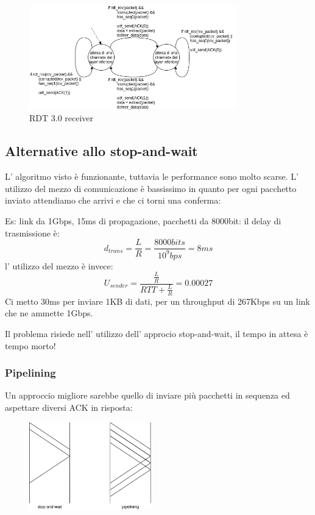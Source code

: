 \begin{figure}[H]
    \centering
    \includegraphics[width=340px]{images/3_Reti_connessione_diretta/rdt_2.2_receiver.png}
    \caption{RDT 3.0 receiver}
\end{figure}

\subsection{Alternative allo stop-and-wait}
L' algoritmo visto è funzionante, tuttavia le performance sono molto scarse.
L' utilizzo del mezzo di comunicazione è bassissimo in quanto per ogni pacchetto inviato attendiamo che arrivi e che ci torni una conferma:

Es: link da 1Gbps, 15ms di propagazione, pacchetti da 8000bit: il delay di trasmissione è:
$$ d_{trans} = \frac{L}{R} = \frac{8000 bits}{10^9 bps} = 8 ms $$
l' utilizzo del mezzo è invece:
$$ U_{sender} = \frac{\frac{L}{R}}{RTT + \frac{L}{R}} = 0.00027 $$
Ci metto 30ms per inviare 1KB di dati, per un throughput di 267Kbps su un link che ne ammette 1Gbps.

Il problema risiede nell' utilizzo dell' approcio stop-and-wait, il tempo in attesa è tempo morto!

\subsubsection{Pipelining}
Un approccio migliore sarebbe quello di inviare più pacchetti in sequenza ed aspettare diversi ACK in risposta:
\begin{figure}[H]
    \centering
    \includegraphics[width=200px]{images/3_Reti_connessione_diretta/stop-and-wait_pipelining.png}
\end{figure}

